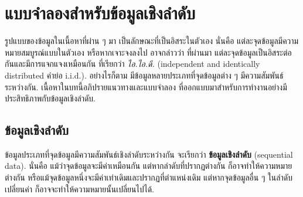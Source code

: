 \chapter{แบบจำลองสำหรับข้อมูลเชิงลำดับ}
\label{chapter: RNN}

\begin{Parallel}[c]{0.45\textwidth}{0.43\textwidth}
\end{Parallel}

รูปแบบของข้อมูลในเนื้อหาที่ผ่าน ๆ มา เป็นลักษณะที่เป็นอิสระในตัวเอง 
นั่นคือ แต่ละจุดข้อมูลมีความหมายสมบูรณ์แบบในตัวเอง
หรือหากเจาะจงลงไป อาจกล่าวว่า 
ที่ผ่านมา แต่ละจุดข้อมูลเป็นอิสระต่อกันและมีการแจกแจงเหมือนกัน ที่เรียกว่า \textit{ไอ.ไอ.ดี.} (independent and identically distributed คำย่อ i.i.d.).
อย่างไรก็ตาม มีข้อมูลหลายประเภทที่จุดข้อมูลต่าง ๆ มีความสัมพันธ์ระหว่างกัน.
เนื้อหาในบทนี้อภิปรายแนวทางและแบบจำลอง
ที่ออกแบบมาสำหรับการทำงานอย่างมีประสิทธิภาพกับข้อมูลเชิงลำดับ.

\section{ข้อมูลเชิงลำดับ}
\label{sec: seq data}
ข้อมูลประเภทที่จุดข้อมูลมีความสัมพันธ์เชิงลำดับระหว่างกัน จะเรียกว่า \textbf{ข้อมูลเชิงลำดับ} (sequential data).
นั่นคือ แม้ว่าจุดข้อมูลจะมีค่าเหมือนกัน แต่หากลำดับที่ปรากฏต่างกัน ก็อาจทำให้ความหมายต่างกัน
หรือแม้จุดข้อมูลหนึ่งจะมีค่าเท่าเดิมและปรากฏที่ตำแหน่งเดิม แต่หากจุดข้อมูลอื่น ๆ ในลำดับเปลี่ยนค่า ก็อาจจะทำให้ความหมายนั้นเปลี่ยนไปได้.

